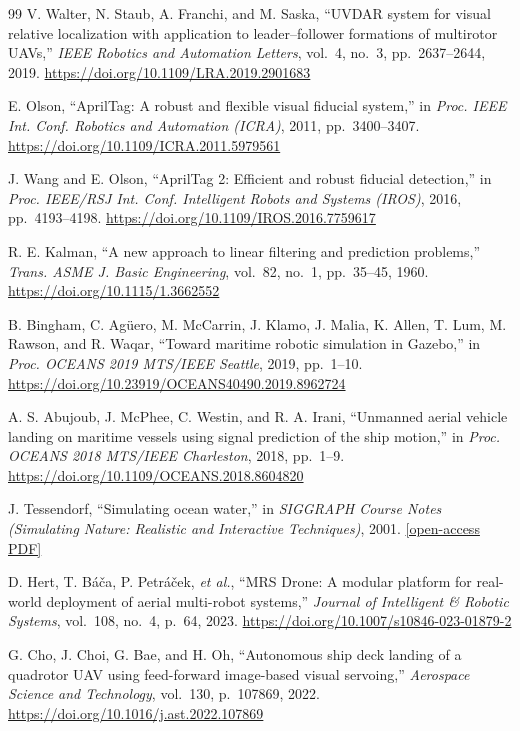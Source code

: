 \documentclass[12pt,a4paper]{report}
\begin{document}
\begin{thebibliography}{99}
 V. Walter, N. Staub, A. Franchi, and M. Saska, ``UVDAR system for visual relative localization with application to leader--follower formations of multirotor UAVs,'' \emph{IEEE Robotics and Automation Letters}, vol.~4, no.~3, pp.~2637--2644, 2019. \href{https://doi.org/10.1109/LRA.2019.2901683}{https://doi.org/10.1109/LRA.2019.2901683}

 E. Olson, ``AprilTag: A robust and flexible visual fiducial system,'' in \emph{Proc. IEEE Int. Conf. Robotics and Automation (ICRA)}, 2011, pp.~3400--3407. \href{https://doi.org/10.1109/ICRA.2011.5979561}{https://doi.org/10.1109/ICRA.2011.5979561}

 J. Wang and E. Olson, ``AprilTag 2: Efficient and robust fiducial detection,'' in \emph{Proc. IEEE/RSJ Int. Conf. Intelligent Robots and Systems (IROS)}, 2016, pp.~4193--4198. \href{https://doi.org/10.1109/IROS.2016.7759617}{https://doi.org/10.1109/IROS.2016.7759617}

 R. E. Kalman, ``A new approach to linear filtering and prediction problems,'' \emph{Trans. ASME J. Basic Engineering}, vol.~82, no.~1, pp.~35--45, 1960. \href{https://doi.org/10.1115/1.3662552}{https://doi.org/10.1115/1.3662552}

 B. Bingham, C. Ag\"uero, M. McCarrin, J. Klamo, J. Malia, K. Allen, T. Lum, M. Rawson, and R. Waqar, ``Toward maritime robotic simulation in Gazebo,'' in \emph{Proc. OCEANS 2019 MTS/IEEE Seattle}, 2019, pp.~1--10. \href{https://doi.org/10.23919/OCEANS40490.2019.8962724}
{https://doi.org/10.23919/OCEANS40490.2019.8962724}

 A. S. Abujoub, J. McPhee, C. Westin, and R. A. Irani, ``Unmanned aerial vehicle landing on maritime vessels using signal prediction of the ship motion,'' in \emph{Proc. OCEANS 2018 MTS/IEEE Charleston}, 2018, pp.~1--9. \href{https://doi.org/10.1109/OCEANS.2018.8604820}{https://doi.org/10.1109/OCEANS.2018.8604820}

 J. Tessendorf, ``Simulating ocean water,'' in \emph{SIGGRAPH Course Notes (Simulating Nature: Realistic and Interactive Techniques)}, 2001. \href{https://people.computing.clemson.edu/~jtessen/reports/papers_files/coursenotes2002.pdf}{[open-access PDF]}

 D. Hert, T. B\'a\v{c}a, P. Petr\'a\v{c}ek, \emph{et al.}, ``MRS Drone: A modular platform for real-world deployment of aerial multi-robot systems,'' \emph{Journal of Intelligent \& Robotic Systems}, vol.~108, no.~4, p.~64, 2023. \href{https://doi.org/10.1007/s10846-023-01879-2}{https://doi.org/10.1007/s10846-023-01879-2}

 G. Cho, J. Choi, G. Bae, and H. Oh, ``Autonomous ship deck landing of a quadrotor UAV using feed-forward image-based visual servoing,'' \emph{Aerospace Science and Technology}, vol.~130, p.~107869, 2022. \href{https://doi.org/10.1016/j.ast.2022.107869}{https://doi.org/10.1016/j.ast.2022.107869}

\end{thebibliography}
\end{document}
